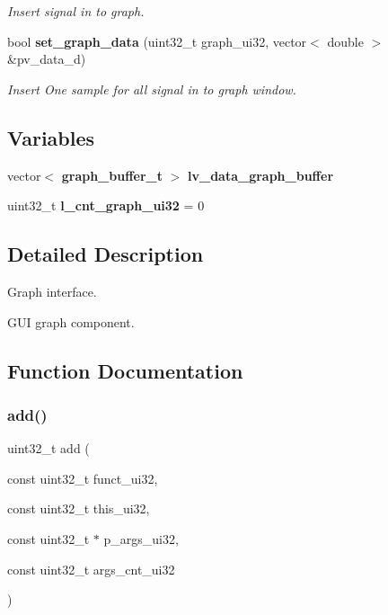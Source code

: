 \begin{DoxyCompactItemize}
\begin{DoxyCompactList}\small\item\em Insert signal in to graph. \end{DoxyCompactList}\item 
bool \textbf{ set\+\_\+graph\+\_\+data} (uint32\+\_\+t graph\+\_\+ui32, vector$<$ double $>$ \&pv\+\_\+data\+\_\+d)
\begin{DoxyCompactList}\small\item\em Insert One sample for all signal in to graph window. \end{DoxyCompactList}\end{DoxyCompactItemize}
\subsection*{Variables}
\begin{DoxyCompactItemize}
\item 
vector$<$ \textbf{ graph\+\_\+buffer\+\_\+t} $>$ \textbf{ lv\+\_\+data\+\_\+graph\+\_\+buffer}
\item 
\mbox{\label{group___graph_ga13361911adaa361953384d128f6a8048}} 
uint32\+\_\+t {\bfseries l\+\_\+cnt\+\_\+graph\+\_\+ui32} = 0
\end{DoxyCompactItemize}


\subsection{Detailed Description}
Graph interface. 

G\+UI graph component.

\subsection{Function Documentation}
\mbox{\label{group___graph_ga490542606fe12f142cd2b00cb1ecaefd}} 
\subsubsection{add()}
{\footnotesize\ttfamily uint32\+\_\+t add (\begin{DoxyParamCaption}\item[{const uint32\+\_\+t}]{funct\+\_\+ui32,  }\item[{const uint32\+\_\+t}]{this\+\_\+ui32,  }\item[{const uint32\+\_\+t $\ast$}]{p\+\_\+args\+\_\+ui32,  }\item[{const uint32\+\_\+t}]{args\+\_\+cnt\+\_\+ui32 }\end{DoxyParamCaption})\hspace{0.3cm}{\ttfamily [static]}}




